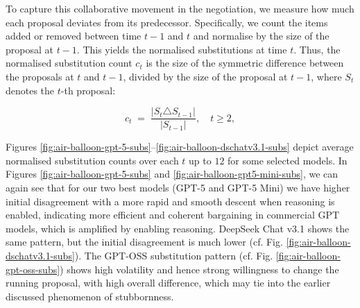 \documentclass[../main.tex]{subfiles}
\begin{document}
To capture this collaborative movement in the negotiation, we measure how much each proposal deviates from its predecessor. Specifically, we count the items added or removed between time $t-1$ and $t$ and normalise by the size of the proposal at $t-1$. This yields the normalised substitutions at time $t$. Thus, the normalised substitution count $c_t$ is the size of the symmetric difference between the proposals at $t$ and $t-1$, divided by the size of the proposal at $t-1$, where $S_t$ denotes the $t$-th proposal:

\[
c_t \;=\; \frac{\lvert S_t \triangle S_{t-1}\rvert}{\lvert S_{t-1}\rvert}, \quad t\ge 2,
\]

Figures \ref{fig:air-balloon-gpt-5-subs}–\ref{fig:air-balloon-dschatv3.1-subs} depict average normalised substitution counts over each $t$ up to $12$ for some selected models. In Figures \ref{fig:air-balloon-gpt-5-subs} and \ref{fig:air-balloon-gpt5-mini-subs}, we can again see that for our two best models (GPT-5 and GPT-5 Mini) we have higher initial disagreement with a more rapid and smooth descent when reasoning is enabled, indicating more efficient and coherent bargaining in commercial GPT models, which is amplified by enabling reasoning. DeepSeek Chat v3.1 shows the same pattern, but the initial disagreement is much lower (cf. Fig. \ref{fig:air-balloon-dschatv3.1-subs}). The GPT-OSS substitution pattern (cf. Fig. \ref{fig:air-balloon-gpt-oss-subs}) shows high volatility and hence strong willingness to change the running proposal, with high overall difference, which may tie into the earlier discussed phenomenon of stubbornness.
\end{document}
